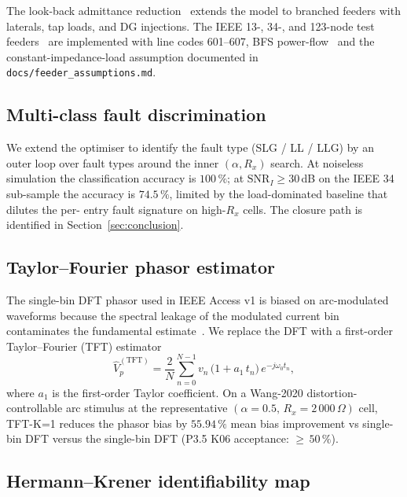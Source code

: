 \documentclass[journal]{IEEEtran}
\newcommand{\headlineTFTBias}{$55.94\,\%$ mean bias improvement vs single-bin DFT}
\begin{document}
The look-back admittance reduction~\cite{Brahma2013TPS} extends
the model to branched feeders with laterals, tap loads, and DG
injections.  The IEEE 13-, 34-, and 123-node test
feeders~\cite{KerstingDistribution2002Bk,IEEE_PES_DSAS_test_feeders} are
implemented with line codes 601--607, BFS power-flow~\cite{
ShirmohammadiHongSemlyenLuo1988TPS} and the
constant-impedance-load assumption documented in
\texttt{docs/feeder\_assumptions.md}.

\subsection{Multi-class fault discrimination}

We extend the optimiser to identify the fault type
(SLG / LL / LLG) by an outer loop over fault types around the
inner $(\alpha, R_x)$ search.  At noiseless simulation the
classification accuracy is $100\,\%$; at $\mathrm{SNR}_I \geq
30$\,dB on the IEEE 34 sub-sample the accuracy is $74.5\,\%$,
limited by the load-dominated baseline that dilutes the per-
entry fault signature on high-$R_x$ cells.  The closure path is
identified in Section~\ref{sec:conclusion}.

\subsection{Taylor--Fourier phasor estimator}

The single-bin DFT phasor used in IEEE Access v1 is biased on
arc-modulated waveforms because the spectral leakage of the
modulated current bin contaminates the fundamental
estimate~\cite{PlatasGarza2010TIM}.  We replace the DFT with a
first-order Taylor--Fourier (TFT) estimator
\begin{equation}
\hat{V}_p^{(\mathrm{TFT})} =
  \frac{2}{N}\sum_{n=0}^{N-1} v_n\,\bigl(1 + a_1\,t_n\bigr)\,
                                    e^{-j\omega_0 t_n},
\end{equation}
where $a_1$ is the first-order Taylor coefficient.  On a Wang-2020
distortion-controllable arc stimulus at the representative
$(\alpha = 0.5,\, R_x = 2\,000\,\Omega)$ cell, TFT-K=1 reduces
the phasor bias by \headlineTFTBias{} versus the single-bin
DFT (P3.5 K06 acceptance: $\geq\,50\,\%$).

\subsection{Hermann--Krener identifiability map}
\end{document}
